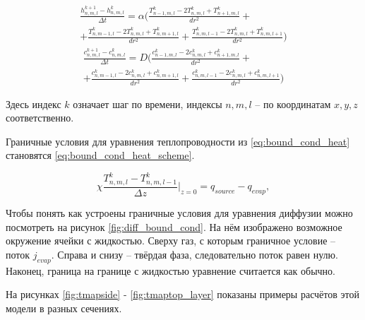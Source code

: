 \begin{multline}
    \label{eq:heat_scheme}
    \frac{h^{k+1}_{n,m,l} - h^{k}_{n,m,l}}{\Delta t} = \alpha \bigl( \frac{T^k_{n-1, m,l} - 2T^k_{n,m,l} + T^k_{n+1,m,l}}{dr^2} + \\
    + \frac{T^k_{n, m-1,l} - 2T^k_{n,m,l} + T^k_{n,m+1,l}}{dr^2} + \frac{T^k_{n, m,l-1} - 2T^k_{n,m,l} + T^k_{n,m,l+1}}{dr^2} \bigr)
\end{multline}
\begin{multline}
    \label{eq:diff_scheme}
    \frac{c^{k+1}_{n,m,l} - c^{k}_{n,m,l}}{\Delta t} = D\bigl( \frac{c^k_{n-1, m,l} - 2c^k_{n,m,l} + c^k_{n+1,m,l}}{dr^2} + \\
     + \frac{c^k_{n, m-1,l} - 2c^k_{n,m,l} + c^k_{n,m+1,l}}{dr^2} + \frac{c^k_{n,m,l-1} - 2c^k_{n,m,l} + c^k_{n,m,l+1}}{dr^2}\bigr)
\end{multline}

\noindent 
Здесь индекс $k$ означает шаг по времени, индексы $n, m, l$ -- по координатам $x, y, z$ соответственно. 

Граничные условия для уравнения теплопроводности из \ref{eq:bound_cond_heat} становятся \ref{eq:bound_cond_heat_scheme}.

\begin{equation}
    \label{eq:bound_cond_heat_scheme}
    \chi \frac{T^k_{n,m,l} - T^k_{n,m,l-1}}{\Delta z}  \big|_{z=0} = q_{source} - q_{evap},
\end{equation}

Чтобы понять как устроены граничные условия для уравнения диффузии можно посмотреть на рисунок \ref{fig:diff_bound_cond}. На нём изображено возможное окружение ячейки с жидкостью. Сверху газ, с которым граничное условие -- поток $j_{evap}$. Справа и снизу -- твёрдая фаза, 
следовательно поток равен нулю. Наконец, граница на границе с жидкостью уравнение считается как обычно.


На рисунках \ref{fig:tmapside} - \ref{fig:tmaptop_layer} показаны примеры расчётов этой модели в разных сечениях.


